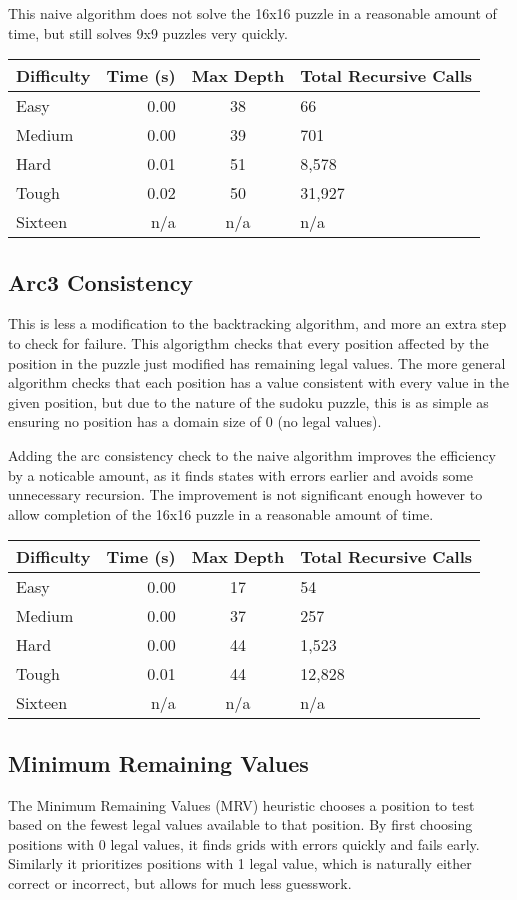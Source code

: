 \documentclass{article}
\begin{document}
This naive algorithm does not solve the 16x16 puzzle in a reasonable
amount of time, but still solves 9x9 puzzles very quickly. \bigskip

\begin{tabular}{l || r | c | l }
Difficulty & Time (s) & Max Depth & Total Recursive Calls \\ \hline
Easy    & 0.00 & 38 & 66 \\
Medium  & 0.00 & 39 & 701 \\
Hard    & 0.01 & 51 & 8,578 \\
Tough   & 0.02 & 50 & 31,927 \\
Sixteen & n/a & n/a & n/a \\ 
\end{tabular}

\subsection{Arc3 Consistency}
This is less a modification to the backtracking algorithm, and more an extra 
step to check for failure. This algorigthm checks that every position affected
by the position in the puzzle just modified has remaining legal values. The 
more general algorithm checks that each position has a value consistent with
every value in the given position, but due to the nature of the sudoku puzzle,
this is as simple as ensuring no position has a domain size of 0 (no legal
values).

Adding the arc consistency check to the naive algorithm improves the efficiency
by a noticable amount, as it finds states with errors earlier and avoids some
unnecessary recursion. The improvement is not significant enough however to 
allow completion of the 16x16 puzzle in a reasonable amount of time. \bigskip


\begin{tabular}{l || r | c | l }
Difficulty & Time (s) & Max Depth & Total Recursive Calls \\ \hline
Easy    & 0.00 & 17 & 54 \\
Medium  & 0.00 & 37 & 257 \\
Hard    & 0.00 & 44 & 1,523 \\
Tough   & 0.01 & 44 & 12,828 \\
Sixteen & n/a & n/a & n/a \\ 
\end{tabular}

\subsection{Minimum Remaining Values}
The Minimum Remaining Values (MRV) heuristic chooses a position to test based
on the fewest legal values available to that position. By first choosing 
positions with 0 legal values, it finds grids with errors quickly and fails
early. Similarly it prioritizes positions with 1 legal value, which is naturally
either correct or incorrect, but allows for much less guesswork. 
\end{document}

